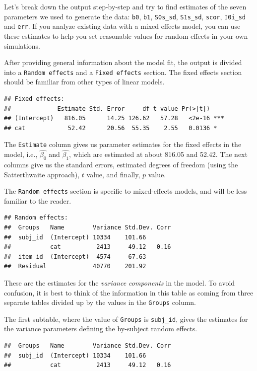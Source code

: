 \documentclass[doc,floatsintext]{apa6}
\begin{document}
\noindent Let's break down the output step-by-step and try to find estimates of the seven parameters we used to generate the data: \texttt{b0}, \texttt{b1}, \texttt{S0s\_sd}, \texttt{S1s\_sd}, \texttt{scor}, \texttt{I0i\_sd} and \texttt{err}. If you analyze existing data with a mixed effects model, you can use these estimates to help you set reasonable values for random effects in your own simulations.

After providing general information about the model fit, the output is divided into a \texttt{Random\ effects} and a \texttt{Fixed\ effects} section. The fixed effects section should be familiar from other types of linear models.

\begin{verbatim}
## Fixed effects:
##             Estimate Std. Error     df t value Pr(>|t|)    
## (Intercept)   816.05      14.25 126.62   57.28   <2e-16 ***
## cat            52.42      20.56  55.35    2.55   0.0136 *
\end{verbatim}

\noindent The \texttt{Estimate} column gives us parameter estimates for the fixed effects in the model, i.e., \(\hat{\beta_0}\) and \(\hat{\beta_1}\), which are estimated at about 816.05 and 52.42. The next columns give us the standard errors, estimated degrees of freedom (using the Satterthwaite approach), \(t\) value, and finally, \(p\) value.

The \texttt{Random\ effects} section is specific to mixed-effects models, and will be less familiar to the reader.

\begin{verbatim}
## Random effects:
##  Groups   Name        Variance Std.Dev. Corr
##  subj_id  (Intercept) 10334    101.66       
##           cat          2413     49.12   0.16
##  item_id  (Intercept)  4574     67.63       
##  Residual             40770    201.92
\end{verbatim}

\noindent These are the estimates for the \emph{variance components} in the model. To avoid confusion, it is best to think of the information in this table as coming from three separate tables divided up by the values in the \texttt{Groups} column.

The first subtable, where the value of \texttt{Groups} is \texttt{subj\_id}, gives the estimates for the variance parameters defining the by-subject random effects.

\begin{verbatim}
##  Groups   Name        Variance Std.Dev. Corr
##  subj_id  (Intercept) 10334    101.66       
##           cat          2413     49.12   0.16
\end{verbatim}
\end{document}
